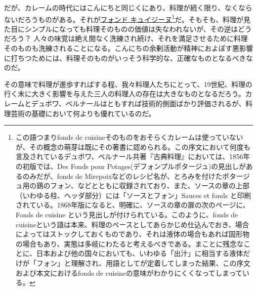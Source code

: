 \begin{main}
だが、カレームの時代にはこんにちと同じくにあり、料理が続く限り、なくならないだろうものがある。それが\href{-料理の基礎}{フォンド
キュイジーヌ}\footnote{この語つまりfonds de
  cuisineそのものをおそらくカレームは使っていないが、その概念の萌芽は既にその著書に認められる。この序文において何度も言及されているデュボワ、ベルナール共著『古典料理』においては、1856年の初版では、Des
  Fonds pour
  Potages(デフォンプルポタージュ)の見出しがあるのみだが、fonds de
  Mirepoixなどのレシピ名が、とろみを付けたポタージュ用の鶏のフォン、などとともに収録されており、また、ソースの章の上部（いわゆる柱、ヘッダ部分）には「ソースとフォン」Sauces
  et fonds
  と印刷されている。1868年版になると、明確に、ソースの章の扉の次のページに、Fonds
  de cuisine という見出しが付けられている。このように、fonds de
  cuisineという語は本来、料理のベースとしてあらかじめ仕込んでおき、場合によってはストックしておくものであり、それは液体の場合もあれば固形物の場合もあり、実態は多岐にわたると考えるべきである。まことに残念なことに、日本および他の国々においても、いわゆる「出汁」に相当する液体だけが「フォン」と理解され、用語としてが定着してしまった結果、この序文および本文におけるfonds
  de cuisineの意味がわかりにくくなってしまっている。}だ。そもそも、料理が見た目にシンプルになっても料理そのものの価値は失なわれないが、その逆はどうだろう？
人々の味覚は絶え間なく洗練され続け、それを満足させるために料理そのものも洗練されることになる。こんにちの余剰活動が精神におよぼす悪影響に打ちつためには、料理そのものがいっそう科学的な、正確なものとなるべきなのだ。

その意味で料理が進歩すればする程、我々料理人たちにとって、19世紀、料理の行く末に大きく影響を与えた三人の料理人の存在は大きなものとなるだろう。カレームとデュボワ、ベルナールはともすれば技術的側面ばかり評価されるが、料理芸術の基礎において何よりも優れているのだ。


\end{main}
